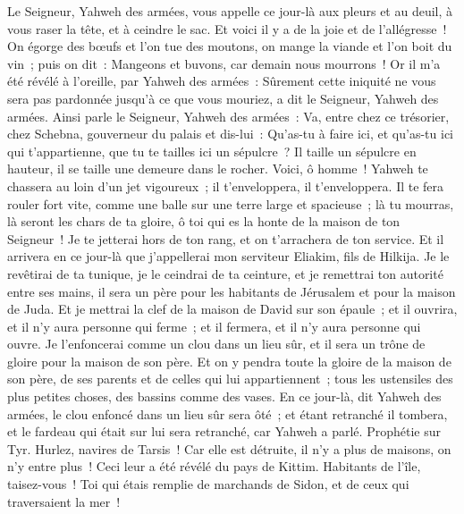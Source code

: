 \begin{multicols}{2}
Le Seigneur, Yahweh des armées, vous appelle ce jour-là aux pleurs et au deuil, à vous raser la tête, et à ceindre le sac.
Et voici il y a de la joie et de l'allégresse~! On égorge des bœufs et l'on tue des moutons, on mange la viande et l'on boit du vin~; puis on dit~: Mangeons et buvons, car demain nous mourrons~!
Or il m'a été révélé à l'oreille, par Yahweh des armées~: Sûrement cette iniquité ne vous sera pas pardonnée jusqu'à ce que vous mouriez, a dit le Seigneur, Yahweh des armées.
Ainsi parle le Seigneur, Yahweh des armées~: Va, entre chez ce trésorier, chez Schebna, gouverneur du palais et dis-lui~:
Qu'as-tu à faire ici, et qu'as-tu ici qui t'appartienne, que tu te tailles ici un sépulcre~? Il taille un sépulcre en hauteur, il se taille une demeure dans le rocher.
Voici, ô homme~! Yahweh te chassera au loin d'un jet vigoureux~; il t'enveloppera, il t'enveloppera.
Il te fera rouler fort vite, comme une balle sur une terre large et spacieuse~; là tu mourras, là seront les chars de ta gloire, ô toi qui es la honte de la maison de ton Seigneur~!
Je te jetterai hors de ton rang, et on t'arrachera de ton service.
Et il arrivera en ce jour-là que j'appellerai mon serviteur Eliakim, fils de Hilkija.
Je le revêtirai de ta tunique, je le ceindrai de ta ceinture, et je remettrai ton autorité entre ses mains, il sera un père pour les habitants de Jérusalem et pour la maison de Juda.
Et je mettrai la clef de la maison de David sur son épaule~; et il ouvrira, et il n'y aura personne qui ferme~; et il fermera, et il n'y aura personne qui ouvre.
Je l'enfoncerai comme un clou dans un lieu sûr, et il sera un trône de gloire pour la maison de son père.
Et on y pendra toute la gloire de la maison de son père, de ses parents et de celles qui lui appartiennent~; tous les ustensiles des plus petites choses, des bassins comme des vases.
En ce jour-là, dit Yahweh des armées, le clou enfoncé dans un lieu sûr sera ôté~; et étant retranché il tombera, et le fardeau qui était sur lui sera retranché, car Yahweh a parlé.
\VerseOne{}Prophétie sur Tyr. Hurlez, navires de Tarsis~! Car elle est détruite, il n'y a plus de maisons, on n'y entre plus~! Ceci leur a été révélé du pays de Kittim.
Habitants de l'île, taisez-vous~! Toi qui étais remplie de marchands de Sidon, et de ceux qui traversaient la mer~!

\end{multicols}
